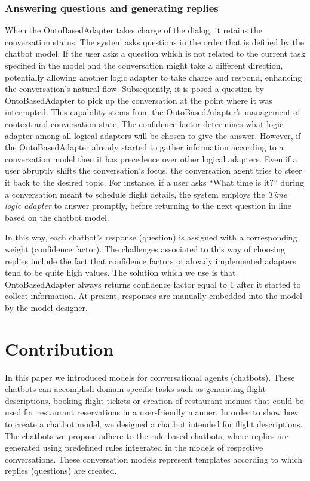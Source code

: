 \documentclass[runningheads]{llncs}
\begin{document}
\subsubsection{Answering questions and generating replies}
When the OntoBasedAdapter takes charge of the dialog, it retains the conversation status. The system asks questions in the order that is defined by the chatbot model. If the user asks a question which is not related to the current task specified in the model and the conversation might take a different direction, potentially allowing another logic adapter to take charge and respond, enhancing the conversation's natural flow. Subsequently, it is posed a question by OntoBasedAdapter to pick up the conversation at the point where it was interrupted. This capability stems from the OntoBasedAdapter's management of context and conversation state.    
The confidence factor determines what logic adapter among all logical adapters will be chosen to give the answer. However, if the OntoBasedAdapter already started to gather information according to a conversation model then it has precedence over other logical adapters. Even if a user abruptly shifts the conversation's focus, the conversation agent tries to steer it back to the desired topic. For instance, if a user asks ``What time is it?'' during a conversation meant to schedule flight details,  the system employs the \textit{Time logic adapter} to answer promptly, before returning to the next question in line based on the chatbot model. 

In this way, each chatbot's response (question) is assigned with a corresponding weight (confidence factor). The challenges associated to this way of choosing replies include the fact that confidence factors of already implemented adapters tend to be quite high values. The solution which we use is that OntoBasedAdapter always returns confidence factor equal to 1 after it started to collect information. At present, responses are manually embedded into the model by the model designer.

\section{Contribution}
In this paper we introduced models for conversational agents (chatbots). These chatbots can accomplish domain-specific tasks such as generating flight descriptions, booking flight tickets or creation of restaurant menues that could be used for restaurant reservations in a user-friendly manner.  
In order to show how to create a chatbot model, we designed a chatbot intended for flight descriptions. 
The chatbots we propose adhere to the rule-based chatbots, where replies are generated using predefined rules intgerated in the models of respective conversations. These conversation models represent templates according to which replies (questions) are created.   
\end{document}
